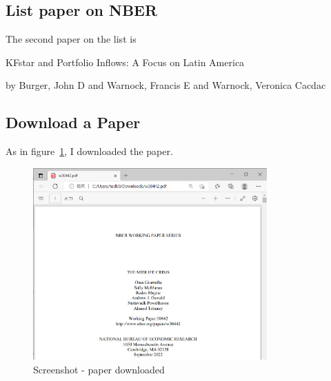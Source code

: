 \subsection{List paper on NBER}

The second paper on the list is 

\begin{displayquote}
    KFstar and Portfolio Inflows: A Focus on Latin America 

    by Burger, John D and Warnock, Francis E and Warnock, Veronica Cacdac
\end{displayquote}

\subsection{Download a Paper}
As in figure~\ref{fig:download_nber}, I downloaded the paper.

\begin{figure}[h]
    \centering
    \includegraphics[width = 0.8\textwidth]{image/NBER_2.png}
    \caption{Screenshot - paper downloaded}
    \label{fig:download_nber}
\end{figure}

